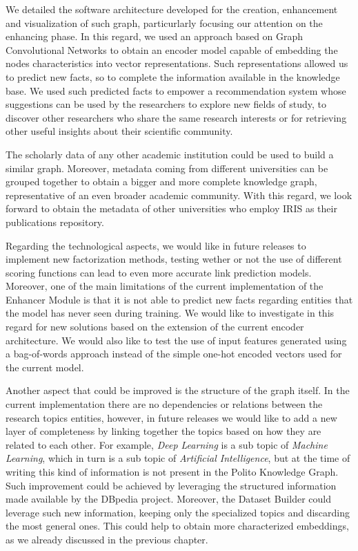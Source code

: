\documentclass[%
    corpo=13.5pt,
    twoside,
    oldstyle,
    tipotesi=magistrale,
    greek,
    evenboxes
]{toptesi}
\begin{document}
We detailed the software architecture developed for the creation, enhancement
and visualization of such graph, particurlarly focusing our attention on the
enhancing phase.
In this regard, we used an approach based on Graph Convolutional
Networks to obtain an encoder model capable of embedding the nodes
characteristics into vector representations.
Such representations allowed us to predict new facts, so to complete the
information available in the knowledge base.
We used such predicted facts to empower a recommendation system whose
suggestions can be used by the researchers to explore new fields of
study, to discover other researchers who share the same research interests or
for retrieving other useful insights about their scientific community.

The scholarly data of any other academic institution could be used to
build a similar graph.
Moreover, metadata coming from different universities can be grouped
together to obtain a bigger and more complete knowledge graph,
representative of an even broader academic community. With this regard, we
look forward to obtain the metadata of other universities who
employ IRIS as their publications repository.

Regarding the technological aspects, we would like in future releases to
implement new factorization methods, testing wether or not the use of
different scoring functions can lead to even more accurate link prediction
models.
Moreover, one of the main limitations of the current implementation of the Enhancer
Module is that it is not able to predict new facts regarding entities that the
model has never seen during training. We would like to investigate in this
regard for new solutions based on the extension of the current encoder
architecture.
We would also like to test the use of input features generated using a
bag-of-words approach instead of the simple one-hot encoded vectors used for
the current model.

Another aspect that could be improved is the structure of the graph itself.
In the current implementation there are no dependencies or relations between
the research topics entities, however, in future releases we would like to add
a new layer of completeness by linking together the topics based on how they are
related to each other.
For example, \emph{Deep Learning} is a sub topic of \emph{Machine Learning},
which in turn is a sub topic of \emph{Artificial Intelligence}, but at the time
of writing this kind of information is not present in the Polito Knowledge Graph.
Such improvement could be achieved by leveraging the structured information
made available by the DBpedia project.
Moreover, the Dataset Builder could leverage such new information, keeping only
the specialized topics and discarding the most general ones. This could help to
obtain more characterized embeddings, as we already discussed in the previous
chapter.
\end{document}
